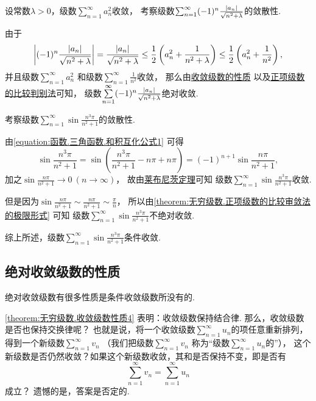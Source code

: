 \begin{example}
设常数\(\lambda>0\)，级数\(\sum_{n=1}^\infty a_n^2\)收敛，
考察级数\(\sum_{n=1}^\infty (-1)^n \frac{\abs{a_n}}{\sqrt{n^2+\lambda}}\)的敛散性.
\begin{solution}
由于\[
	\abs{(-1)^n \frac{\abs{a_n}}{\sqrt{n^2+\lambda}}}
	= \frac{\abs{a_n}}{\sqrt{n^2+\lambda}}
	\leq \frac{1}{2} \left( a_n^2 + \frac{1}{n^2+\lambda} \right)
	\leq \frac{1}{2} \left( a_n^2 + \frac{1}{n^2} \right),
\]
并且级数\(\sum\limits_{n=1}^\infty a_n^2\)
和级数\(\sum\limits_{n=1}^\infty \frac{1}{n^2}\)收敛，
那么由\hyperref[theorem:无穷级数.收敛级数性质2]{收敛级数的性质}%
以及\hyperref[theorem:无穷级数.正项级数的比较审敛法的推论]{正项级数的比较判别法}可知，
级数\(\sum\limits_{n=1}^\infty (-1)^n \frac{\abs{a_n}}{\sqrt{n^2+\lambda}}\)绝对收敛.
\end{solution}
\end{example}
\begin{example}
考察级数\(\sum_{n=1}^\infty \sin\frac{n^3\pi}{n^2+1}\)的敛散性.
\begin{solution}
由\cref{equation:函数.三角函数.和积互化公式1} 可得\begin{equation*}
	\sin\frac{n^3\pi}{n^2+1}
	= \sin\left( \frac{n^3\pi}{n^2+1} - n\pi + n\pi \right)
	= (-1)^{n+1} \sin\frac{n\pi}{n^2+1},
\end{equation*}
加之\(\sin\frac{n\pi}{n^2+1}\to0\ (n\to\infty)\)，
故由\hyperref[theorem:无穷级数.莱布尼茨定理]{莱布尼茨定理}可知
级数\(\sum_{n=1}^\infty \sin\frac{n^3\pi}{n^2+1}\)收敛.

但是因为\(\sin\frac{n\pi}{n^2+1}
\sim \frac{n\pi}{n^2+1}
\sim \frac\pi{n}\)，
所以由\cref{theorem:无穷级数.正项级数的比较审敛法的极限形式} 可知
级数\(\sum_{n=1}^\infty \sin\frac{n^3\pi}{n^2+1}\)不绝对收敛.

综上所述，级数\(\sum_{n=1}^\infty \sin\frac{n^3\pi}{n^2+1}\)条件收敛.
\end{solution}
\end{example}

\subsection{绝对收敛级数的性质}
绝对收敛级数有很多性质是条件收敛级数所没有的.

\cref{theorem:无穷级数.收敛级数性质4} 表明：收敛级数保持结合律.
那么，收敛级数是否也保持交换律呢？
也就是说，将一个收敛级数\(\sum_{n=1}^\infty u_n\)的项任意重新排列，
得到一个新级数\(\sum_{n=1}^\infty v_n\)
（我们把级数\(\sum_{n=1}^\infty v_n\)
称为“级数\(\sum_{n=1}^\infty u_n\)的”），
这个新级数是否仍然收敛？如果这个新级数收敛，其和是否保持不变，即是否有\[
	\sum_{n=1}^\infty v_n = \sum_{n=1}^\infty u_n
\]成立？
遗憾的是，答案是否定的.

